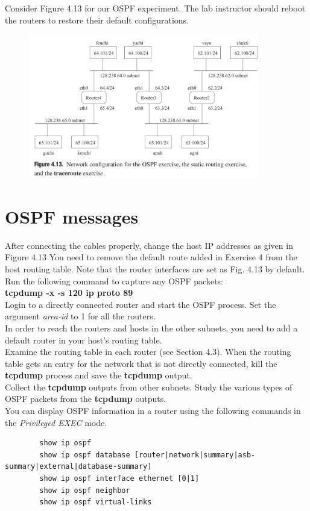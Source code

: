 \documentclass{../UTNetLab}
\begin{document}
    Consider Figure 4.13 for our OSPF experiment.
    The lab instructor should reboot the routers to restore their default configurations.
    \begin{figure}[H]
        \centering
        \includegraphics[width=0.9\textwidth]{img/figure4-13.png}
    \end{figure}

\section{OSPF messages}
    After connecting the cables properly, change the host IP addresses as given in Figure 4.13 You need to remove the default route added in Exercise 4 from the host routing table.
    Note that the router interfaces are set as Fig. 4.13 by default. \\
    Run the following command to capture any OSPF packets: \\
    \textbf{tcpdump -x -s 120 ip proto 89} \\
    Login to a directly connected router and start the OSPF process.
    Set the argument \textit{area-id} to 1 for all the routers. \\
    In order to reach the routers and hosts in the other subnets, you need to add a default router in your host’s routing table. \\
    Examine the routing table in each router (see Section 4.3).
    When the routing table gets an entry for the network that is not directly connected, kill the \textbf{tcpdump} process and save the \textbf{tcpdump} output. \\
    Collect the \textbf{tcpdump} outputs from other subnets.
    Study the various types of OSPF packets from the \textbf{tcpdump} outputs. \\
    You can display OSPF information in a router using the following commands in the \textit{Privileged EXEC} mode.
    \begin{verbatim}
        show ip ospf
        show ip ospf database [router|network|summary|asb-summary|external|database-summary]
        show ip ospf interface ethernet [0|1]
        show ip ospf neighbor
        show ip ospf virtual-links
    \end{verbatim}
\end{document}
